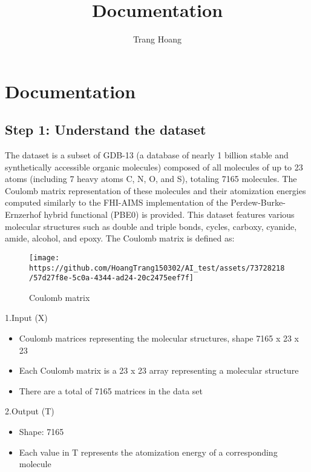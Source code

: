 \documentclass{article}
\begin{document}
\title{Documentation}
\author{Trang Hoang}
\maketitle

\section{Documentation}\label{documentation}

\subsection{Step 1: Understand the
dataset}\label{step-1-understand-the-dataset}

The dataset is a subset of GDB-13 (a database of nearly 1 billion stable
and synthetically accessible organic molecules) composed of all
molecules of up to 23 atoms (including 7 heavy atoms C, N, O, and S),
totaling 7165 molecules. The Coulomb matrix representation of these
molecules and their atomization energies computed similarly to the
FHI-AIMS implementation of the Perdew-Burke-Ernzerhof hybrid functional
(PBE0) is provided. This dataset features various molecular structures
such as double and triple bonds, cycles, carboxy, cyanide, amide,
alcohol, and epoxy. The Coulomb matrix is defined as:

\begin{figure}
\centering
\texttt{[image: https://github.com/HoangTrang150302/AI\_test/assets/73728218/57d27f8e-5c0a-4344-ad24-20c2475eef7f]}
\caption{Coulomb matrix}
\end{figure}

1.Input (X)

\begin{itemize}
\item
  Coulomb matrices representing the molecular structures, shape 7165 x
  23 x 23
\item
  Each Coulomb matrix is a 23 x 23 array representing a molecular
  structure
\item
  There are a total of 7165 matrices in the data set
\end{itemize}

2.Output (T)

\begin{itemize}
\item
  Shape: 7165
\item
  Each value in T represents the atomization energy of a corresponding
  molecule
\end{itemize}
\end{document}
